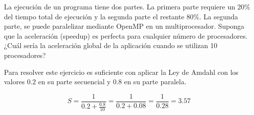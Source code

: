\begin{acexercise}\end{acexercise}

La ejecución de un programa tiene dos partes. La primera parte requiere un 20\%
del tiempo total de ejecución y la segunda parte el restante 80\%. La segunda
parte, se puede paralelizar mediante OpenMP en un multiprocesador. Suponga que
la aceleración (speedup) es perfecta para cualquier número de procesadores.
¿Cuál sería la aceleración global de la aplicación cuando se utilizan 10
procesadores?


\begin{acsolution}\end{acsolution}

Para resolver este ejercicio es suficiente con aplicar la Ley de Amdahl con los
valores $0.2$ en su parte secuencial y $0.8$ en su parte paralela.

\[
S = \frac{1}{0.2 + \frac{0.8}{10}} = \frac{1}{0.2 + 0.08} = \frac{1}{0.28} =
3.57
\]
